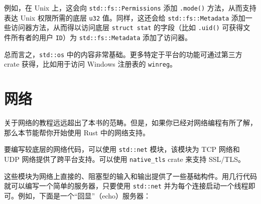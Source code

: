 例如，在 Unix 上，这会向 \texttt{std::fs::Permissions} 添加 \texttt{.mode()} 方法，从而支持表达 Unix 权限所需的底层 \texttt{u32} 值。同样，这还会给 \texttt{std::fs::Metadata} 添加一些访问器方法，从而得以访问底层 \texttt{struct stat} 的字段（比如 \texttt{.uid()} 可获得文件所有者的用户 \texttt{ID}）为 \texttt{std::fs::Metadata} 添加了访问器。

总而言之，\texttt{std::os} 中的内容非常基础。更多特定于平台的功能可通过第三方 crate 获得，比如用于访问 Windows 注册表的 \texttt{winreg}。

\section{网络}

关于网络的教程远远超出了本书的范畴。但是，如果你已经对网络编程有所了解，那么本节能帮你开始使用 Rust 中的网络支持。

要编写较底层的网络代码，可以使用 \texttt{std::net} 模块，该模块为 TCP 网络和 UDP 网络提供了跨平台支持。可以使用 \texttt{native\_tls} crate 来支持 SSL/TLS。

这些模块为网络上直接的、阻塞型的输入和输出提供了一些基础构件。用几行代码就可以编写一个简单的服务器，只要使用 \texttt{std::net} 并为每个连接启动一个线程即可。例如，下面是一个“回显”（echo）服务器：

